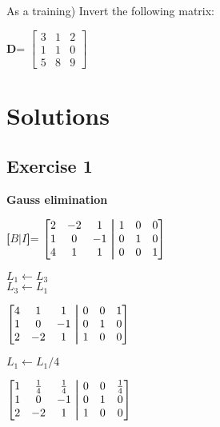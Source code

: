 \documentclass[12pt]{article}
\newcommand\aug{\fboxsep=-\fboxrule\!\!\!\fbox{\strut}\!\!\!}
\newenvironment{exercise}[2][Exercise]{\begin{trivlist}
\item[\hskip \labelsep {\bfseries #1}\hskip \labelsep {\bfseries #2.}]}{\end{trivlist}}
\begin{document}
\begin{exercise}{4} (As a training)
Invert the following matrix:
\begin{center}
\textbf{D}=
$
\begin{bmatrix}
3 & 1 & 2 \\
1 & 1 & 0 \\
5 & 8 & 9
\end{bmatrix}
$
\end{center}
\end{exercise}

\break

\section{Solutions}

\subsection{Exercise 1}

\textbf{Gauss elimination} \\

\begin{center}
\textbf{[$B \vert I$]}=
$\begin{bmatrix}
2 & -2 & 1 & \aug & 1 & 0 & 0 \\
1 & 0 & -1 & \aug & 0 & 1 & 0 \\
4 & 1 & 1 & \aug & 0 & 0 & 1 \\
\end{bmatrix}
$
\end{center}

\noindent $L_1 \gets L_3$ \\
$L_3 \gets L_1$ \\
\begin{center}
$\begin{bmatrix}
4 & 1 & 1 & \aug & 0 & 0 & 1 \\
1 & 0 & -1 & \aug & 0 & 1 & 0 \\
2 & -2 & 1 & \aug & 1 & 0 & 0 \\
\end{bmatrix}$
\end{center}

\noindent $L_1 \gets L_1/4$ \\
\begin{center}
$\begin{bmatrix}
1 & \frac{1}{4} & \frac{1}{4} & \aug & 0 & 0 & \frac{1}{4} \\
1 & 0 & -1 & \aug & 0 & 1 & 0 \\
2 & -2 & 1 & \aug & 1 & 0 & 0 \\
\end{bmatrix}$
\end{center}
\end{document}
